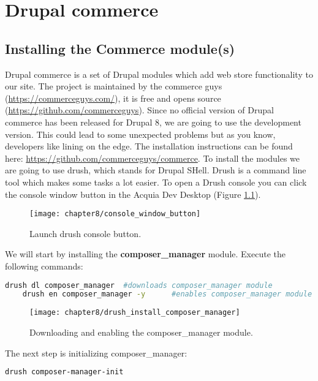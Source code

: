 \chapter{Drupal commerce}

\section{Installing the Commerce module(s)}

Drupal commerce is a set of Drupal modules which add web store functionality to our site. The project is maintained by the commerce guys (\url{https://commerceguys.com/}), it is free and opens source (\url{https://github.com/commerceguys}). Since no official version of Drupal commerce has been released for Drupal 8, we are going to use the development version. This could lead to some unexpected problems but as you know, developers like lining on the edge.
The installation instructions can be found here: \url{https://github.com/commerceguys/commerce}. To install the modules we are going to use drush, which stands for Drupal SHell. Drush is a command line tool which makes some tasks a lot easier. To open a Drush console you can click the console window button in the Acquia Dev Desktop (Figure \ref{fig:console_window_button}).

\begin{figure}[H]
	\centering
	\texttt{[image: chapter8/console\_window\_button]}
	\caption{Launch drush console button.}
	\label{fig:console_window_button}
\end{figure}

We will start by installing the \textbf{composer\_manager} module. Execute the following commands:

\begin{lstlisting}[language=bash]
	drush dl composer_manager  #downloads composer_manager module
	drush en composer_manager -y      #enables composer_manager module
\end{lstlisting}

\begin{figure}[H]
	\centering
	\texttt{[image: chapter8/drush\_install\_composer\_manager]}
	\caption{Downloading and enabling the composer\_manager module.}
	\label{fig:drush_install_composer_manager}
\end{figure}

The next step is initializing composer\_manager:

\begin{lstlisting}[language=bash]
drush composer-manager-init
\end{lstlisting}

